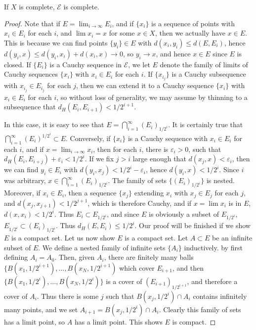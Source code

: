 \begin{theorem}
	If $X$ is complete, $\mathcal{E}$ is complete.
\end{theorem}
\begin{proof}
	Note that if $E = \lim_{i \to \infty} E_i$, and if $\{ x_i \}$ is a sequence of points with $x_i \in E_i$ for each $i$, and $\lim x_i = x$ for some $x \in X$, then we actually have $x \in E$. This is because we can find points $\{ y_i \} \in E$ with $d(x_i,y_i) \leq d(E,E_i)$, hence $d(y_i,x) \leq d(y_i,x_i) + d(x_i,x) \to 0$, so $y_i \to x$, and hence $x \in E$ since $E$ is closed. If $\{ E_i \}$ is a Cauchy sequence in $\mathcal{E}$, we let $E$ denote the family of limits of Cauchy sequences $\{ x_i \}$ with $x_i \in E_i$ for each $i$. If $\{ x_{i_j} \}$ is a Cauchy subsequence with $x_{i_j} \in E_{i_j}$ for each $j$, then we can extend it to a Cauchy sequence $\{ x_i \}$ with $x_i \in E_i$ for each $i$, so without loss of generality, we may assume by thinning to a subsequence that $d_H(E_i,E_{i+1}) < 1/2^{i+1}$.

	In this case, it is easy to see that $E = \bigcap_{i = 1}^\infty (E_i)_{1/2^i}$. It is certainly true that $\bigcap_{i = 1}^\infty (E_i)^{1/2^i} \subset E$. Conversely, if $\{ x_i \}$ is a Cauchy sequence with $x_i \in E_i$ for each $i$, and if $x = \lim_{i \to \infty} x_i$, then for each $i$, there is $\varepsilon_i > 0$, such that $d_H(E_i,E_{i+j}) + \varepsilon_i < 1/2^i$. If we fix $j > i$ large enough that $d(x_j,x) < \varepsilon_i$, then we can find $y_i \in E_i$ with $d(y_i,x_j) < 1/2^i - \varepsilon_i$, hence $d(y_i,x) < 1/2^i$. Since $i$ was arbitrary, $x \in \bigcap_{i = 1}^\infty (E_i)_{1/2^i}$. The family of sets $\{ (E_i)_{1/2^i} \}$ is nested. Moreover, if $x_i \in E_i$, then a sequence $\{ x_j \}$ extending $x_i$ with $x_j \in E_j$ for each $j$, and $d(x_j,x_{j+1}) < 1/2^{j+1}$, which is therefore Cauchy, and if $x = \lim x_i$ is in $E$, $d(x,x_i) < 1/2^i$. Thus $E_i \subset E_{1/2^i}$, and since $E$ is obviously a subset of $E_{1/2^i}$, $E_{1/2^i} \subset (E_i)_{1/2^i}$. Thus $d_H(E,E_i) \leq 1/2^i$. Our proof will be finished if we show $E$ is a compact set. Let us now show $E$ is a compact set. Let $A \subset E$ be an infinite subset of $E$. We define a nested family of infinite sets $\{ A_i \}$ inductively. by first defining $A_i = A_0$. Then, given $A_i$, there are finitely many balls $\{ B(x_1,1/2^{i+1}), \dots, B(x_N,1/2^{i+1})$ which cover $E_{i+1}$, and then $\{ B(x_1,1/2^i), \dots, B(x_N,1/2^i) \}$ is a cover of $(E_{i+1})_{1/2^{i+1}}$, and therefore a cover of $A_i$. Thus there is some $j$ such that $B(x_j,1/2^i) \cap A_i$ contains infinitely many points, and we set $A_{i+1} = B(x_j,1/2^i) \cap A_i$. Clearly this family of sets has a limit point, so $A$ has a limit point. This shows $E$ is compact.
\end{proof}

